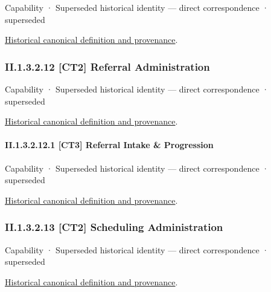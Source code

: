\label{element:466a4057001846bb8ae0481453d3e410}
{\small Capability · Superseded historical identity — direct correspondence · superseded}\par
\href{../../../../continuum/strategy/capability/466a4057001846bb8ae0481453d3e410.md}{Historical canonical definition and provenance}.\par
\subsubsection*{II.1.3.2.12 [CT2] Referral Administration}
\label{navigation:II.1.3.2.12}

\label{element:5b0ccf4b30054145952c298b348ed266}
{\small Capability · Superseded historical identity — direct correspondence · superseded}\par
\href{../../../../continuum/strategy/capability/5b0ccf4b30054145952c298b348ed266.md}{Historical canonical definition and provenance}.\par
\paragraph*{II.1.3.2.12.1 [CT3] Referral Intake \& Progression}
\label{navigation:II.1.3.2.12.1}

\label{element:7180f6265d5c4687a001220c6126e301}
{\small Capability · Superseded historical identity — direct correspondence · superseded}\par
\href{../../../../continuum/strategy/capability/7180f6265d5c4687a001220c6126e301.md}{Historical canonical definition and provenance}.\par
\subsubsection*{II.1.3.2.13 [CT2] Scheduling Administration}
\label{navigation:II.1.3.2.13}

\label{element:1a6630940ffb44fcad4543b93a367b67}
{\small Capability · Superseded historical identity — direct correspondence · superseded}\par
\href{../../../../continuum/strategy/capability/1a6630940ffb44fcad4543b93a367b67.md}{Historical canonical definition and provenance}.\par
